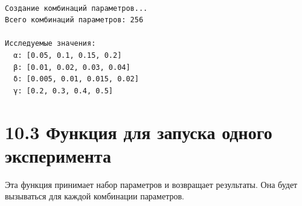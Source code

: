 \documentclass[
  12pt,
  a4paper,
  DIV=11,
  numbers=noendperiod]{scrreprt}
\begin{document}
\begin{verbatim}

Создание комбинаций параметров...
Всего комбинаций параметров: 256

Исследуемые значения:
  α: [0.05, 0.1, 0.15, 0.2]
  β: [0.01, 0.02, 0.03, 0.04]
  δ: [0.005, 0.01, 0.015, 0.02]
  γ: [0.2, 0.3, 0.4, 0.5]
\end{verbatim}

\section{10.3 Функция для запуска одного
эксперимента}\label{ux444ux443ux43dux43aux446ux438ux44f-ux434ux43bux44f-ux437ux430ux43fux443ux441ux43aux430-ux43eux434ux43dux43eux433ux43e-ux44dux43aux441ux43fux435ux440ux438ux43cux435ux43dux442ux430-1}

Эта функция принимает набор параметров и возвращает результаты. Она
будет вызываться для каждой комбинации параметров.
\end{document}

